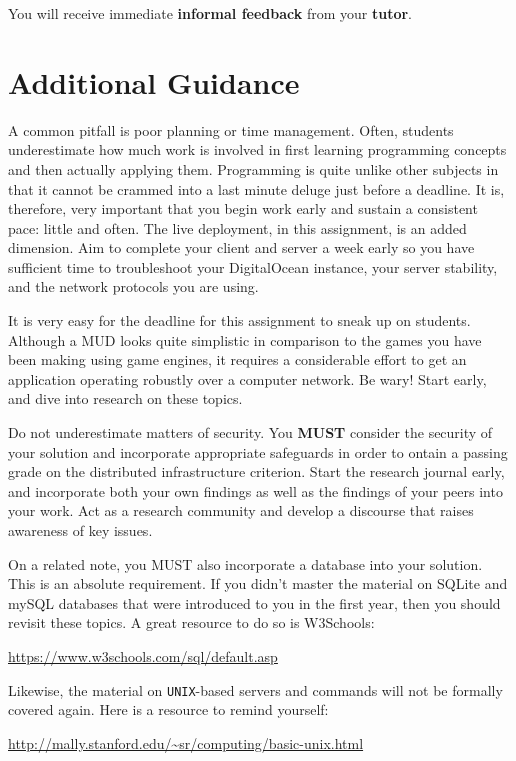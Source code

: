 \documentclass{../../fal_assignment}
\begin{document}
You will receive immediate \textbf{informal feedback} from your \textbf{tutor}.

\section*{Additional Guidance}

A common pitfall is poor planning or time management. Often, students underestimate how much work is involved in first learning programming concepts and then actually applying them. Programming is quite unlike other subjects in that it cannot be crammed into a last minute deluge just before a deadline. It is, therefore, very important that you begin work early and sustain a consistent pace: little and often. The live deployment, in this assignment, is an added dimension. Aim to complete your client and server a week early so you have sufficient time to troubleshoot your DigitalOcean instance, your server stability, and the network protocols you are using.

It is very easy for the deadline for this assignment to sneak up on students. Although a MUD looks quite simplistic in comparison to the games you have been making using game engines, it requires a considerable effort to get an application operating robustly over a computer network. Be wary! Start early, and dive into research on these topics. 

Do not underestimate matters of security. You \textbf{MUST} consider the security of your solution and incorporate appropriate safeguards in order to ontain a passing grade on the distributed infrastructure criterion. Start the research journal early, and incorporate both your own findings as well as the findings of your peers into your work. Act as a research community and develop a discourse that raises awareness of key issues.

On a related note, you MUST also incorporate a database into your solution.
This is an absolute requirement. If you didn't master the material on SQLite
and mySQL databases that were introduced to you in the first year, then you
should revisit these topics. A great resource to do so is 
W3Schools:

\url{https://www.w3schools.com/sql/default.asp}

Likewise, the material on \texttt{UNIX}-based servers and commands will not be formally covered again. Here is a resource to remind yourself:

\url{http://mally.stanford.edu/~sr/computing/basic-unix.html}
\end{document}
